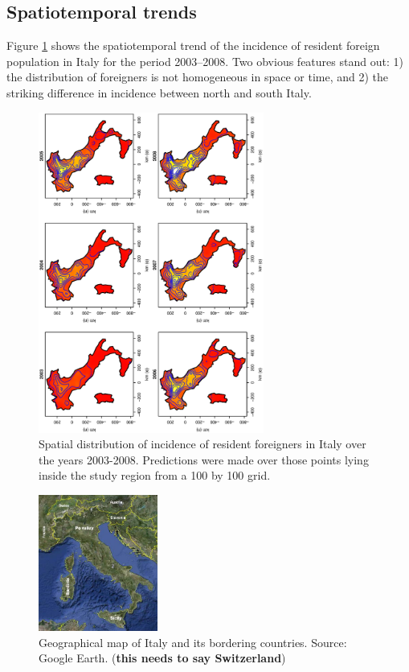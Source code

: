 \documentclass[10pt]{article}
\theoremstyle{definition}
\theoremstyle{plain}
\begin{document}
\subsection{Spatiotemporal trends \label{STT}}


Figure \ref{fig2} shows the spatiotemporal trend of the incidence of resident foreign population in Italy for the period 2003--2008. Two obvious features stand out: 1) the distribution of foreigners is not homogeneous in space or time, and 2) the striking difference in incidence between north and south Italy.  

\begin{figure}[tbp]
	\centering
		\includegraphics[width=0.66\textwidth, angle=270]{SmoothPlot.eps}
	\caption{Spatial distribution of incidence of resident foreigners in Italy over the years 2003-2008. Predictions were made over those points lying inside the study region from a 100 by 100 grid.}
	\label{fig2}
\end{figure}


\begin{figure}[tbp]
	\centering
		\includegraphics[width=0.35\textwidth]{mapIT.eps}
	\caption{Geographical map of Italy and its bordering countries. Source: Google Earth. (\textbf{this needs to say Switzerland})  }
	\label{fig1}
\end{figure}
\end{document}
